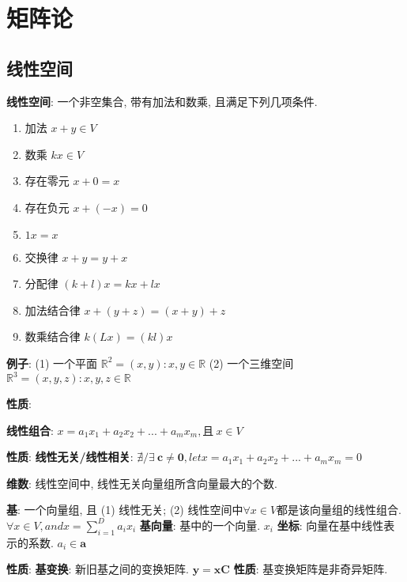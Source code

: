 \documentclass{article}
\title{}\date{} \setlength{\parindent}{0pt} \linespread{1.25}
\begin{document}
\tableofcontents

\section{矩阵论}
    \subsection{线性空间}
        \textbf{线性空间}: 一个非空集合, 带有加法和数乘, 且满足下列几项条件.
            \begin{enumerate}
                \item 加法   $x+y \in V$
                \item 数乘   $k x \in V$
                \item 存在零元 $x+0=x$
                \item 存在负元 $x+(-x) = 0$
                \item $1x = x$
                \item 交换律 $x+y = y+x$
                \item 分配律 $(k+l)x = kx+lx$
                \item 加法结合律 $x+(y+z) = (x+y) +z$
                \item 数乘结合律 $k(Lx) = (kl)x$
            \end{enumerate}
            
            \textbf{例子}:
                (1) 一个平面 $\mathbb R^2 = {(x,y): x, y\in \mathbb R}$
                (2) 一个三维空间 $\mathbb R^3 = {(x,y,z): x, y, z\in \mathbb R}$

            \textbf{性质}:


        \textbf{线性组合}: $x = a_1 x_1 +a_2 x_2+ ...+a_m x_m, \text{且}\ x \in V$

            \textbf{性质}: 
                \textbf{线性无关/线性相关}: $\nexists / \exists\ \boldsymbol c \neq \boldsymbol 0, let x = a_1 x_1 + a_2 x_2+ ...+a_m x_m = 0$ 

        \textbf{维数}: 线性空间中, 线性无关向量组所含向量最大的个数.
        
        \textbf{基}: 一个向量组, 且 (1) 线性无关; (2) 线性空间中$\forall x \in V$都是该向量组的线性组合. $\forall x \in V, and x = \sum\limits_{i=1}^{D} a_i x_i$
            \textbf{基向量}: 基中的一个向量. $x_i$
            \textbf{坐标}: 向量在基中线性表示的系数. $a_i \in \boldsymbol a$

        \textbf{性质}: 
            \textbf{基变换}: 新旧基之间的变换矩阵. $\boldsymbol y = \boldsymbol x \boldsymbol C$
                \textbf{性质}: 基变换矩阵是非奇异矩阵.
\end{document}
